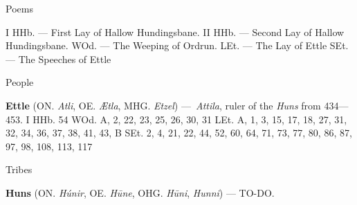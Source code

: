 Poems

I HHb. — First Lay of Hallow Hundingsbane.
II HHb. — Second Lay of Hallow Hundingsbane.
WOd. — The Weeping of Ordrun.
LEt. — The Lay of Ettle
SEt. — The Speeches of Ettle

People

\textbf{Ettle} (ON. \emph{Atli}, OE. \emph{Ætla}, MHG. \emph{Etzel}) — \emph{Attila}, ruler of the \emph{Huns} from 434—453.
 I HHb. 54
 WOd. A, 2, 22, 23, 25, 26, 30, 31
 LEt. A, 1, 3, 15, 17, 18, 27, 31, 32, 34, 36, 37, 38, 41, 43, B
 SEt. 2, 4, 21, 22, 44, 52, 60, 64, 71, 73, 77, 80, 86, 87, 97, 98, 108, 113, 117

Tribes

\textbf{Huns} (ON. \emph{Húnir}, OE. \emph{Hūne}, OHG. \emph{Hūni}, \emph{Hunni}) — TO-DO.
